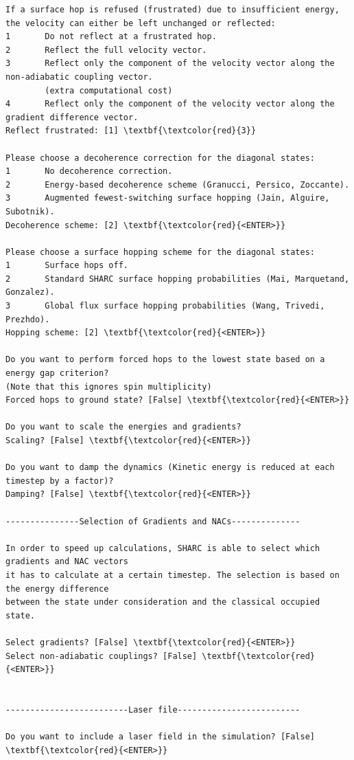\documentclass[a4paper,11pt,DIV=15,openany]{scrbook}
\begin{document}
\begin{oframed}
\begin{Verbatim}[commandchars=\\\{\}]
If a surface hop is refused (frustrated) due to insufficient energy, 
the velocity can either be left unchanged or reflected:
1       Do not reflect at a frustrated hop.
2       Reflect the full velocity vector.
3       Reflect only the component of the velocity vector along the non-adiabatic coupling vector.
        (extra computational cost)
4       Reflect only the component of the velocity vector along the gradient difference vector.
Reflect frustrated: [1] \textbf{\textcolor{red}{3}}

Please choose a decoherence correction for the diagonal states:
1       No decoherence correction.
2       Energy-based decoherence scheme (Granucci, Persico, Zoccante).
3       Augmented fewest-switching surface hopping (Jain, Alguire, Subotnik).
Decoherence scheme: [2] \textbf{\textcolor{red}{<ENTER>}}

Please choose a surface hopping scheme for the diagonal states:
1       Surface hops off.
2       Standard SHARC surface hopping probabilities (Mai, Marquetand, Gonzalez).
3       Global flux surface hopping probabilities (Wang, Trivedi, Prezhdo).
Hopping scheme: [2] \textbf{\textcolor{red}{<ENTER>}}

Do you want to perform forced hops to the lowest state based on a energy gap criterion?
(Note that this ignores spin multiplicity)
Forced hops to ground state? [False] \textbf{\textcolor{red}{<ENTER>}}

Do you want to scale the energies and gradients?
Scaling? [False] \textbf{\textcolor{red}{<ENTER>}}

Do you want to damp the dynamics (Kinetic energy is reduced at each timestep by a factor)?
Damping? [False] \textbf{\textcolor{red}{<ENTER>}}

---------------Selection of Gradients and NACs--------------

In order to speed up calculations, SHARC is able to select which gradients and NAC vectors 
it has to calculate at a certain timestep. The selection is based on the energy difference 
between the state under consideration and the classical occupied state.

Select gradients? [False] \textbf{\textcolor{red}{<ENTER>}}
Select non-adiabatic couplings? [False] \textbf{\textcolor{red}{<ENTER>}}


-------------------------Laser file-------------------------

Do you want to include a laser field in the simulation? [False] \textbf{\textcolor{red}{<ENTER>}}


\end{Verbatim}
\end{oframed}
\end{document}

